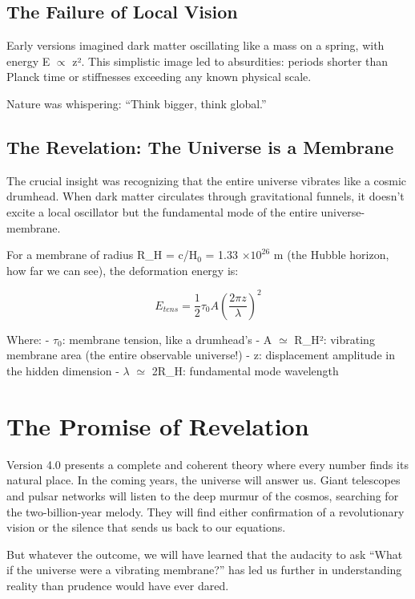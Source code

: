 \documentclass[
  11pt,
]{report}
\begin{document}
\subsection{The Failure of Local
Vision}\label{the-failure-of-local-vision-1}

Early versions imagined dark matter oscillating like a mass on a spring,
with energy E \(\propto\) z². This simplistic image led to absurdities:
periods shorter than Planck time or stiffnesses exceeding any known
physical scale.

Nature was whispering: ``Think bigger, think global.''

\subsection{The Revelation: The Universe is a
Membrane}\label{the-revelation-the-universe-is-a-membrane-1}

The crucial insight was recognizing that the entire universe vibrates
like a cosmic drumhead. When dark matter circulates through
gravitational funnels, it doesn't excite a local oscillator but the
fundamental mode of the entire universe-membrane.

For a membrane of radius R\_H = c/H\(_0\) = 1.33 \(\times 10^{26}\) m
(the Hubble horizon, how far we can see), the deformation energy is:

\[E_{tens} = \frac{1}{2} \tau_0 A \left(\frac{2\pi z}{\lambda}\right)^2\]

Where: - \(\tau_0\): membrane tension, like a drumhead's - A \(\simeq\)
R\_H²: vibrating membrane area (the entire observable universe!) - z:
displacement amplitude in the hidden dimension - \(\lambda\) \(\simeq\)
2R\_H: fundamental mode wavelength

\section{The Promise of Revelation}\label{the-promise-of-revelation}

Version 4.0 presents a complete and coherent theory where every number
finds its natural place. In the coming years, the universe will answer
us. Giant telescopes and pulsar networks will listen to the deep murmur
of the cosmos, searching for the two-billion-year melody. They will find
either confirmation of a revolutionary vision or the silence that sends
us back to our equations.

But whatever the outcome, we will have learned that the audacity to ask
``What if the universe were a vibrating membrane?'' has led us further
in understanding reality than prudence would have ever dared.
\end{document}
